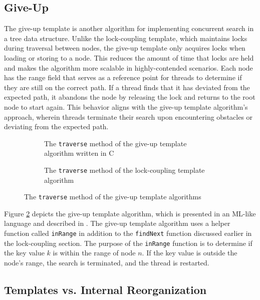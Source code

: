 \documentclass[a4paper,UKenglish,cleveref, autoref, thm-restate]{lipics-v2021}
\begin{document}
\subsection{Give-Up}
The give-up template is another algorithm for implementing concurrent search in a tree data structure. Unlike the lock-coupling template, which maintains locks during traversal between nodes, the give-up template only acquires locks when loading or storing to a node. This reduces the amount of time that locks are held and makes the algorithm more scalable in highly-contended scenarios. Each node has the range field that serves as a reference point for threads to determine if they are still on the correct path. If a thread finds that it has deviated from the expected path, it abandons the node by releasing the lock and returns to the root node to start again. This behavior aligns with the give-up template algorithm's approach, wherein threads terminate their search upon encountering obstacles or deviating from the expected path.

\begin{figure}[!ht]
	\begin{subfigure}[t]{0.48\textwidth}
		 
		\caption{The \lstinline{traverse} method of the give-up template algorithm written in C}
		\label{traverse_giveup_a}
	\end{subfigure}\qquad
	\begin{subfigure}[t]{0.45\textwidth}
		 
		\caption{The \lstinline{traverse} method of the lock-coupling template algorithm}
		\label{traverse_giveup_b}	
	\end{subfigure}
	\caption{The \lstinline{traverse} method of the give-up template algorithms}
	\label{traverse_giveup}
\end{figure}

Figure \ref{traverse_giveup_b} depicts the give-up template algorithm, which is presented in an ML-like language and described in \cite{shasha_1988}. 
The give-up template algorithm uses a helper function called \lstinline{inRange} in addition to the \lstinline{findNext} function discussed earlier in the lock-coupling section. The purpose of the \lstinline{inRange} function is to determine if the key value $k$ is within the range of node $n$. If the key value is outside the node's range, the search is terminated, and the thread is restarted.

\subsection{Templates vs. Internal Reorganization}
\end{document}
